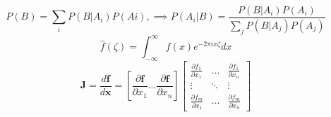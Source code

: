 \documentclass{article}
\begin{document}

\begin{equation}
P(B)=\sum_{i} P(B|A_i)P(Ai),
\implies P(A_i|B)=\frac{P(B|A_i)P(A_i)}{\sum_{j} P(B|A_j)P(A_j)}
\end{equation}
\begin{equation}
\hat f(\zeta) = \int_{-\infty}^{\infty} f(x) e^{-2\pi ix \zeta} dx
\end{equation}
\begin{equation}
\mathbf{J} = \frac{d\mathbf{f}}{d\mathbf {x}} = \left[ \frac{\partial{\mathbf {f}}}{\partial{x_1}}...\frac{\partial{\mathbf {f}}}{\partial{x_n}} \right] 
\begin{bmatrix}
    \frac{\partial{{f_1}}}{\partial{x_1}} & \dots & \frac{\partial{{f_1}}}{\partial{x_n}} \\
   
    \vdots & \ddots &\vdots\\
    \frac{\partial{ {f_m}}}{\partial{x_1}}  &   \dots &\frac{\partial{{f_m}}}{\partial{x_n}}
\end{bmatrix}
\end{equation}
\end{document}
